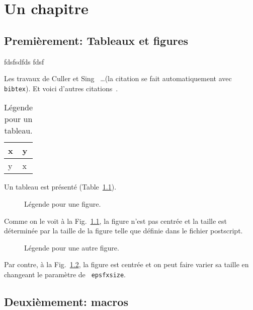  
\chapter{Un chapitre}
\label{un-chap.chap}

\section{Premi\`erement: Tableaux et figures}

fdsfsdfds fdsf

Les travaux de Culler et Sing~\cite{CullerSin99} \ldots (la citation se fait automatiquement avec
{\tt bibtex}). Et voici d'autres
citations~\cite{AndersonEtAl95,Andrews00,AppelbeEtAl96}.


\begin{table}[htbp]
\begin{center}
\begin{tabular}{|l|l|}\hline
x & y \\\hline
y & x \\\hline
\end{tabular}
\end{center}
\caption{L\'egende pour un tableau.}
\label{table.tab}
\end{table}

Un tableau est pr\'esent\'e (Table~\ref{table.tab}).



\begin{figure}[htbp]


\caption{L\'egende pour une figure.}
\label{figure-1.fig}
\end{figure}
Comme on le voit \`a la Fig.~\ref{figure-1.fig}, la figure n'est pas
centr\'ee et la taille est d\'etermin\'ee par la taille de la figure
telle que d\'efinie dans le fichier postscript.


\begin{figure}[htbp]

\centerline{\epsfxsize=4cm }


\caption{L\'egende pour une autre figure.}
\label{figure-2.fig}
\end{figure}

Par contre, \`a la Fig.~\ref{figure-2.fig}, la figure est centr\'ee et
on peut faire varier sa taille en changeant le param\`etre de {\tt
epsfxsize}.




\section{Deuxi\`emement: macros}


